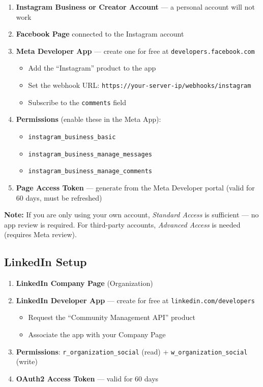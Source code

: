 \documentclass[12pt,a4paper]{article}
\begin{document}
\begin{enumerate}[leftmargin=1.5em, itemsep=0.3em]
    \item \textbf{Instagram Business or Creator Account} --- a personal account will not work
    \item \textbf{Facebook Page} connected to the Instagram account
    \item \textbf{Meta Developer App} --- create one for free at \texttt{developers.facebook.com}
    \begin{itemize}[itemsep=0.2em]
        \item Add the ``Instagram'' product to the app
        \item Set the webhook URL: \texttt{https://your-server-ip/webhooks/instagram}
        \item Subscribe to the \texttt{comments} field
    \end{itemize}
    \item \textbf{Permissions} (enable these in the Meta App):
    \begin{itemize}[itemsep=0.2em]
        \item \texttt{instagram\_business\_basic}
        \item \texttt{instagram\_business\_manage\_messages}
        \item \texttt{instagram\_business\_manage\_comments}
    \end{itemize}
    \item \textbf{Page Access Token} --- generate from the Meta Developer portal (valid for 60 days, must be refreshed)
\end{enumerate}

\begin{tcolorbox}[colback=blue!3, colframe=pri, boxrule=0.4pt]
\textbf{Note:} If you are only using your own account, \textit{Standard Access} is sufficient --- no app review is required. For third-party accounts, \textit{Advanced Access} is needed (requires Meta review).
\end{tcolorbox}

\subsection{LinkedIn Setup}

\begin{enumerate}[leftmargin=1.5em, itemsep=0.3em]
    \item \textbf{LinkedIn Company Page} (Organization)
    \item \textbf{LinkedIn Developer App} --- create for free at \texttt{linkedin.com/developers}
    \begin{itemize}[itemsep=0.2em]
        \item Request the ``Community Management API'' product
        \item Associate the app with your Company Page
    \end{itemize}
    \item \textbf{Permissions}: \texttt{r\_organization\_social} (read) + \texttt{w\_organization\_social} (write)
    \item \textbf{OAuth2 Access Token} --- valid for 60 days
\end{enumerate}
\end{document}
